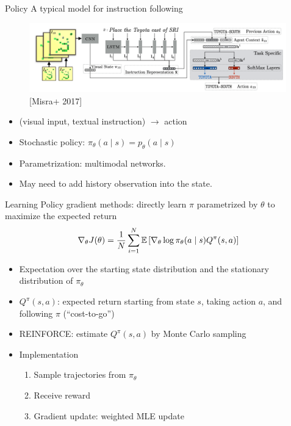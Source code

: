 \documentclass[usenames,dvipsnames,notes]{beamer}
\begin{document}
\begin{frame}
    {Policy}
    A typical model for instruction following
    \vspace{-1em}
    \begin{figure}
        \includegraphics[height=3cm]{figures/policy}
        \caption{[Misra+ 2017]}
    \end{figure}
    \vspace{-1em}
    \begin{itemize}
        \item (visual input, textual instruction) $\to$ action
        \item Stochastic policy:
            $\pi_\theta(a\mid s)=p_\theta(a\mid s)$
        \item Parametrization: multimodal networks.
        \item May need to add history observation into the state.
    \end{itemize}
\end{frame}

\begin{frame}
    {Learning}
    Policy gradient methods:
    directly learn $\pi$ parametrized by $\theta$
    to maximize the expected return
            $$
            \nabla_\theta J(\theta) = \frac{1}{N}\sum_{i=1}^N
            \mathbb{E}\left[ \nabla_\theta\log\pi_\theta(a\mid s)Q^\pi(s,a) \right]
            $$
            \vspace{-1em}
            \begin{itemize}
                \item Expectation over the starting state distribution and the stationary distribution of $\pi_\theta$
                \item $Q^\pi(s,a)$: expected return starting from state $s$, taking action $a$, and following $\pi$ (``cost-to-go'')
                \item REINFORCE: estimate $Q^\pi(s,a)$ by Monte Carlo sampling
                \item Implementation
                    \begin{enumerate}
                        \item Sample trajectories from $\pi_\theta$
                        \item Receive reward
                        \item Gradient update: weighted MLE update
                    \end{enumerate}
            \end{itemize}
\end{frame}
\end{document}
